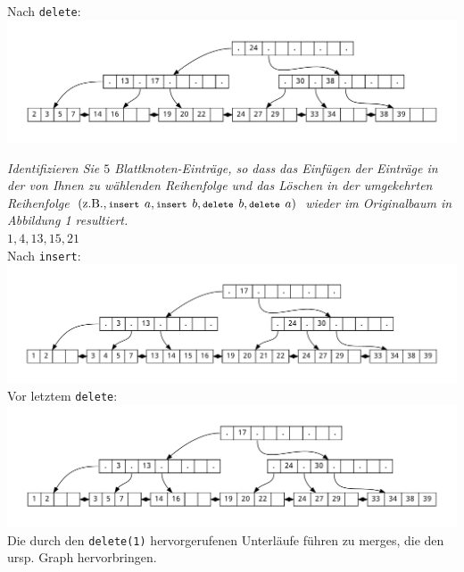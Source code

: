 \documentclass{uni_tue_template}
\newcommand{\code}[1]{\texttt{{\footnotesize #1}}}
\begin{document}
  Nach \code{delete}:\\
  \includegraphics[scale=0.4]{./dot/A3_1-2.pdf}
  \item \emph{Identifizieren Sie $5$ Blattknoten-Einträge, so dass das Einfügen der Einträge in der von Ihnen zu wählenden Reihenfolge und das Löschen in der umgekehrten Reihenfolge $(\text{z.B.}, \code{insert } a, \code{insert } b, \code{delete } b, \code{delete } a)$ wieder im Originalbaum in Abbildung 1 resultiert.}\\
  $1, 4, 13, 15, 21$\\
  Nach \code{insert}:\\
  \includegraphics[scale=0.4]{./dot/A3_2-1.pdf}\\
  Vor letztem \code{delete}:\\
  \includegraphics[scale=0.4]{./dot/A3_2-2.pdf}\\
  Die durch den \code{delete(1)} hervorgerufenen Unterläufe führen zu merges, die den ursp. Graph hervorbringen.
  
\subExEnd{}
\end{document}
